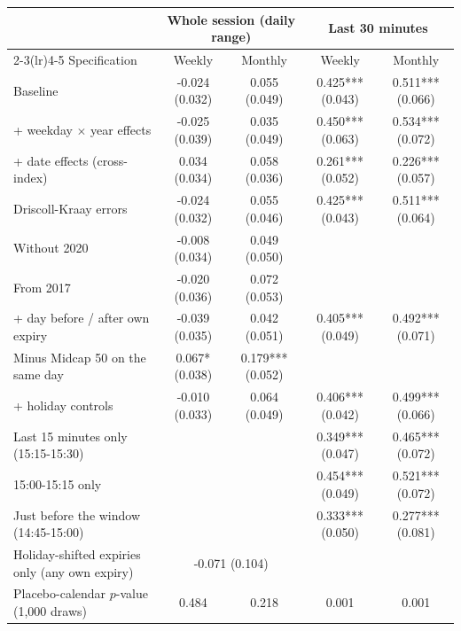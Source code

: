 \begin{tabular}{lcccc}
\toprule
 & \multicolumn{2}{c}{Whole session (daily range)} & \multicolumn{2}{c}{Last 30 minutes} \\
\cmidrule(lr){2-3}\cmidrule(lr){4-5}
Specification & Weekly & Monthly & Weekly & Monthly \\
\midrule
Baseline & -0.024 (0.032) & 0.055 (0.049) & 0.425*** (0.043) & 0.511*** (0.066) \\
+ weekday $\times$ year effects & -0.025 (0.039) & 0.035 (0.049) & 0.450*** (0.063) & 0.534*** (0.072) \\
+ date effects (cross-index) & 0.034 (0.034) & 0.058 (0.036) & 0.261*** (0.052) & 0.226*** (0.057) \\
Driscoll-Kraay errors & -0.024 (0.032) & 0.055 (0.046) & 0.425*** (0.043) & 0.511*** (0.064) \\
Without 2020 & -0.008 (0.034) & 0.049 (0.050) &  &  \\
From 2017 & -0.020 (0.036) & 0.072 (0.053) &  &  \\
+ day before / after own expiry & -0.039 (0.035) & 0.042 (0.051) & 0.405*** (0.049) & 0.492*** (0.071) \\
Minus Midcap 50 on the same day & 0.067* (0.038) & 0.179*** (0.052) &  &  \\
+ holiday controls & -0.010 (0.033) & 0.064 (0.049) & 0.406*** (0.042) & 0.499*** (0.066) \\
Last 15 minutes only (15:15-15:30) &  &  & 0.349*** (0.047) & 0.465*** (0.072) \\
15:00-15:15 only &  &  & 0.454*** (0.049) & 0.521*** (0.072) \\
Just before the window (14:45-15:00) &  &  & 0.333*** (0.050) & 0.277*** (0.081) \\
Holiday-shifted expiries only (any own expiry) & \multicolumn{2}{c}{-0.071 (0.104)} & & \\
\midrule
Placebo-calendar $p$-value (1,000 draws) & 0.484 & 0.218 & 0.001 & 0.001 \\
\bottomrule
\end{tabular}